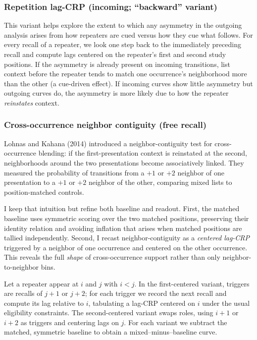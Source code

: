 \documentclass[
  letterpaper,
  11pt,
  english,
  singlespacing,
  headsepline]{MastersDoctoralThesis}
\begin{document}
\subsubsection{Repetition lag-CRP (incoming; ``backward''
variant)}\label{repetition-lag-crp-incoming-backward-variant}

This variant helps explore the extent to which any asymmetry in the
outgoing analysis arises from how repeaters are cued versus how they cue
what follows. For every recall of a repeater, we look one step back to
the immediately preceding recall and compute lags centered on the
repeater's first and second study positions. If the asymmetry is already
present on incoming transitions, list context before the repeater tends
to match one occurrence's neighborhood more than the other (a cue-driven
effect). If incoming curves show little asymmetry but outgoing curves
do, the asymmetry is more likely due to how the repeater
\emph{reinstates} context.

\subsubsection{Cross-occurrence neighbor contiguity (free
recall)}\label{cross-occurrence-neighbor-contiguity-free-recall}

Lohnas and Kahana (2014) introduced a neighbor-contiguity test for
cross-occurrence blending: if the first-presentation context is
reinstated at the second, neighborhoods around the two presentations
become associatively linked. They measured the probability of
transitions from a \(+1\) or \(+2\) neighbor of one presentation to a
\(+1\) or \(+2\) neighbor of the other, comparing mixed lists to
position-matched controls.

I keep that intuition but refine both baseline and readout. First, the
matched baseline uses symmetric scoring over the two matched positions,
preserving their identity relation and avoiding inflation that arises
when matched positions are tallied independently. Second, I recast
neighbor-contiguity as a \emph{centered lag-CRP} triggered by a neighbor
of one occurrence and centered on the other occurrence. This reveals the
full \emph{shape} of cross-occurrence support rather than only
neighbor-to-neighbor bins.

Let a repeater appear at \(i\) and \(j\) with \(i<j\). In the
first-centered variant, triggers are recalls of \(j{+}1\) or \(j{+}2\);
for each trigger we record the next recall and compute its lag relative
to \(i\), tabulating a lag-CRP centered on \(i\) under the usual
eligibility constraints. The second-centered variant swaps roles, using
\(i{+}1\) or \(i{+}2\) as triggers and centering lags on \(j\). For each
variant we subtract the matched, symmetric baseline to obtain a
mixed--minus--baseline curve.
\end{document}
